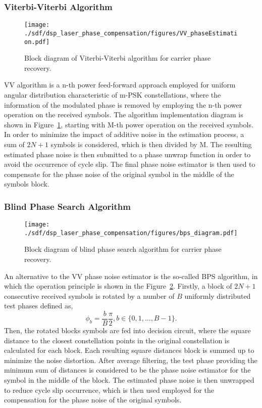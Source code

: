 \subsubsection{Viterbi-Viterbi Algorithm}
\begin{figure}[h!]
    \centering
    \texttt{[image: ./sdf/dsp\_laser\_phase\_compensation/figures/VV\_phaseEstimation.pdf]}
    \caption{Block diagram of Viterbi-Viterbi algorithm for carrier phase recovery.}
    \label{fig_VVdiagram}
\end{figure}
VV algorithm is a n-th power feed-forward approach employed for uniform angular distribution characteristic of m-PSK constellations, where the information of the modulated phase is removed by employing the n-th power operation on the received symbols. The algorithm implementation diagram is shown in Figure~\ref{fig_VVdiagram}, starting with M-th power operation on the received symbols. In order to minimize the impact of additive noise in the estimation process, a sum of $2N+1$ symbols is considered, which is then divided by M. The resulting estimated phase noise is then submitted to a phase unwrap function in order to avoid the occurrence of cycle slip. The final phase noise estimator is then used to compensate for the phase noise of the original symbol in the middle of the symbols block.

\subsubsection{Blind Phase Search Algorithm}
\begin{figure}[h!]
    \centering
    \texttt{[image: ./sdf/dsp\_laser\_phase\_compensation/figures/bps\_diagram.pdf]}
    \caption{Block diagram of blind phase search algorithm for carrier phase recovery.}
    \label{fig_BPSdiagram}
\end{figure}
An alternative to the VV phase noise estimator is the so-called BPS algorithm, in which the operation principle is shown in the Figure~\ref{fig_BPSdiagram}. Firstly, a block of $2N+1$ consecutive received symbols is rotated by a number of $B$ uniformly distributed test phases defined as,
\begin{equation}
    	\phi_{b} = \frac{b}{B}\frac{\pi}{2}, b \in\{0,1,...,B-1\}.
    \label{eq_phaseNoise}
\end{equation}
Then, the rotated blocks symbols are fed into decision circuit, where the square distance to the closest constellation points in the original constellation is calculated for each block. Each resulting square distances block is summed up to minimize the noise distortion. After average filtering, the test phase providing the minimum sum of distances is considered to be the phase noise estimator for the symbol in the middle of the block. The estimated phase noise is then unwrapped to reduce cycle slip occurrence, which is then used employed for the compensation for the phase noise of the original symbols.

